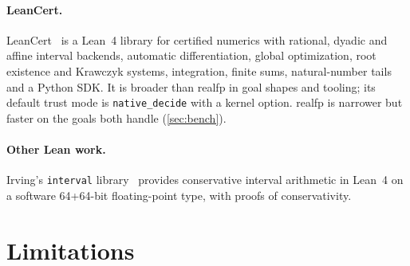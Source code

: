 \documentclass[11pt]{article}
\theoremstyle{definition}
\theoremstyle{remark}
\newcommand{\lean}[1]{\texttt{#1}}
\newcommand{\realfp}{\textsf{realfp}}
\begin{document}
\paragraph{LeanCert.} LeanCert~\cite{leancert} is a Lean~4 library for
certified numerics with rational, dyadic and affine interval backends,
automatic differentiation, global optimization, root existence and
Krawczyk systems, integration, finite sums, natural-number tails and a
Python SDK. It is broader than \realfp{} in goal shapes and tooling; its
default trust mode is \lean{native\_decide} with a kernel option. \realfp{}
is narrower but faster on the goals both handle (\cref{sec:bench}).

\paragraph{Other Lean work.} Irving's \lean{interval}
library~\cite{irvinginterval} provides conservative interval arithmetic in
Lean~4 on a software 64+64-bit floating-point type, with proofs of
conservativity.

\section{Limitations}\label{sec:limits}
\end{document}
